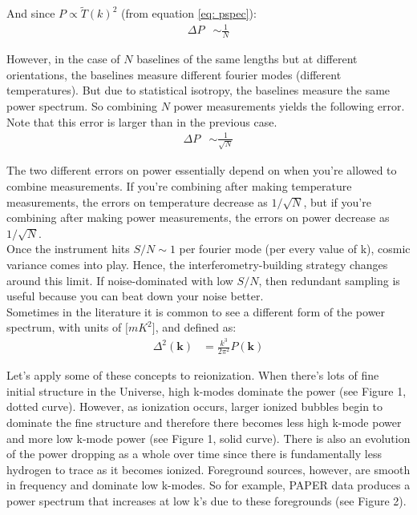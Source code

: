 \documentclass[12pt]{article}
\begin{document}
\noindent And since $P \propto \tilde{T}(k)^{2}$ (from equation \ref{eq: pspec}):
\begin{align}
\Delta P &\sim {\frac{1}{N}}
\end{align}

\noindent However, in the case of $N$ baselines of the same lengths but at different orientations, the baselines measure different fourier modes (different temperatures). But due to statistical isotropy, the baselines measure the same power spectrum. So combining $N$ power measurements yields the following error. Note that this error is larger than in the previous case. 
\begin{align}
\Delta P &\sim {\frac{1}{\sqrt{N}}}
\end{align}

\noindent The two different errors on power essentially depend on when you're allowed to combine measurements. If you're combining after making temperature measurements, the errors on temperature decrease as $1/\sqrt{N}$, but if you're combining after making power measurements, the errors on power decrease as $1/\sqrt{N}$. \\

\noindent Once the instrument hits $S/N \sim 1$ per fourier mode (per every value of k), cosmic variance comes into play. Hence, the interferometry-building strategy changes around this limit. If noise-dominated with low $S/N$, then redundant sampling is useful because you can beat down your noise better. \\ 

\noindent Sometimes in the literature it is common to see a different form of the power spectrum, with units of $\Big[mK^{2}\Big]$, and defined as:
\begin{align}
\Delta^{2}(\boldsymbol{k}) &= {\frac{k^{3}}{2\pi^{2}}}P(\boldsymbol{k})
\end{align}

\noindent Let's apply some of these concepts to reionization. When there's lots of fine initial structure in the Universe, high k-modes dominate the power (see Figure 1, dotted curve). However, as ionization occurs, larger ionized bubbles begin to dominate the fine structure and therefore there becomes less high k-mode power and more low k-mode power (see Figure 1, solid curve). There is also an evolution of the power dropping as a whole over time since there is fundamentally less hydrogen to trace as it becomes ionized. Foreground sources, however, are smooth in frequency and dominate low k-modes. So for example, PAPER data produces a power spectrum that increases at low k's due to these foregrounds (see Figure 2). \\
\end{document}
